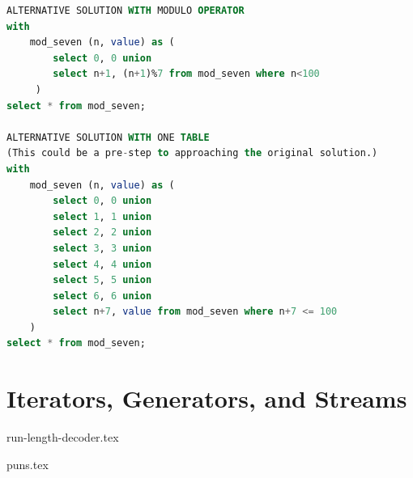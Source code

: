 \documentclass{exam}
\begin{document}
\begin{questions}
\begin{blocksection}
\begin{solution}[1in]
\begin{lstlisting}[language=SQL]
ALTERNATIVE SOLUTION WITH MODULO OPERATOR
with
    mod_seven (n, value) as (
        select 0, 0 union
        select n+1, (n+1)%7 from mod_seven where n<100
     )
select * from mod_seven;

ALTERNATIVE SOLUTION WITH ONE TABLE
(This could be a pre-step to approaching the original solution.)
with
    mod_seven (n, value) as (
        select 0, 0 union
        select 1, 1 union
        select 2, 2 union
        select 3, 3 union
        select 4, 4 union
        select 5, 5 union
        select 6, 6 union
        select n+7, value from mod_seven where n+7 <= 100
    )
select * from mod_seven;
\end{lstlisting}
\end{solution}
\end{blocksection}

\section{Iterators, Generators, and Streams}
\begin{blocksection}
{run-length-decoder.tex}

\end{blocksection}

\begin{blocksection}
{puns.tex}

\end{blocksection}

\end{questions}




\end{document}
